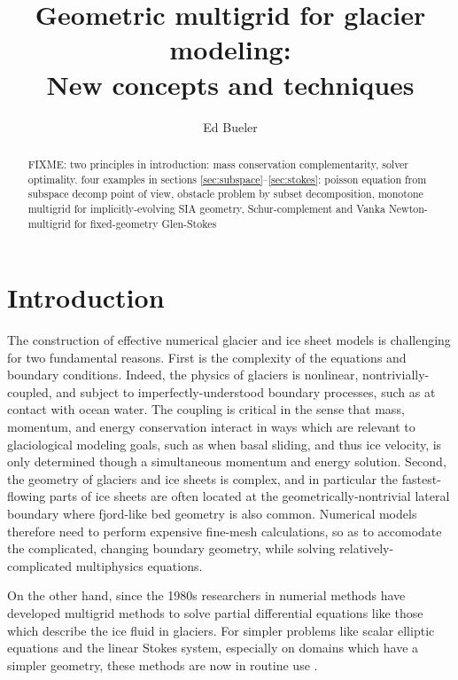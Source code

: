 \documentclass[letterpaper,final,12pt,reqno]{amsart}
\theoremstyle{claim}
\numberwithin{equation}{section}
\numberwithin{figure}{section}
\numberwithin{table}{section}
\begin{document}
\title[Geometric multigrid for glacier modeling]{Geometric multigrid for glacier modeling: \\ New concepts and techniques}

\author{Ed Bueler}

\begin{abstract} FIXME: two principles in introduction: mass conservation complementarity, solver optimality.  four examples in sections \ref{sec:subspace}--\ref{sec:stokes}: poisson equation from subspace decomp point of view, obstacle problem by subset decomposition, monotone multigrid for implicitly-evolving SIA geometry, Schur-complement and Vanka Newton-multigrid for fixed-geometry Glen-Stokes
\end{abstract}

\maketitle

\tableofcontents

\thispagestyle{empty}
\bigskip

\section{Introduction} \label{sec:intro}

The construction of effective numerical glacier and ice sheet models is challenging for two fundamental reasons.  First is the complexity of the equations and boundary conditions.  Indeed, the physics of glaciers is nonlinear, nontrivially-coupled, and subject to imperfectly-understood boundary processes, such as at contact with ocean water.  The coupling is critical in the sense that mass, momentum, and energy conservation interact in ways which are relevant to glaciological modeling goals, such as when basal sliding, and thus ice velocity, is only determined though a simultaneous momentum and energy solution.  Second, the geometry of glaciers and ice sheets is complex, and in particular the fastest-flowing parts of ice sheets are often located at the geometrically-nontrivial lateral boundary where fjord-like bed geometry is also common.  Numerical models therefore need to perform expensive fine-mesh calculations, so as to accomodate the complicated, changing boundary geometry, while solving relatively-complicated multiphysics equations.

On the other hand, since the 1980s researchers in numerial methods have developed multigrid methods to solve partial differential equations like those which describe the ice fluid in glaciers.   For simpler problems like scalar elliptic equations and the linear Stokes system, especially on domains which have a simpler geometry, these methods are now in routine use \cite{Briggsetal2000,Bueler2021,Trottenbergetal2001}.
\end{document}
